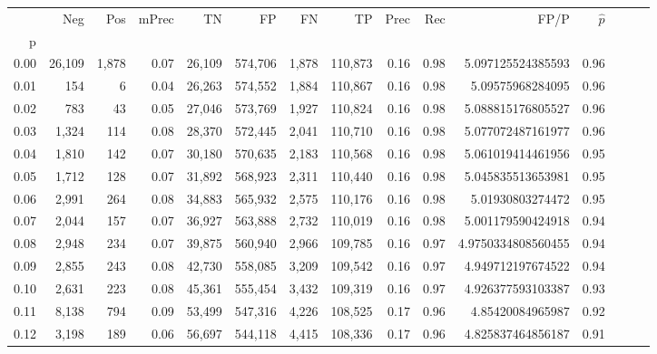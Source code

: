 \begin{tabular}{rrrrrrrrrrrrrrr}
\toprule
{} &     Neg &    Pos & mPrec &       TN &       FP &       FN &       TP &  Prec &   Rec &                  FP/P & $\hat{p}$ \\
p    &         &        &       &          &          &          &          &       &       &                       &           \\
\midrule
0.00 &  26,109 &  1,878 &  0.07 &   26,109 &  574,706 &    1,878 &  110,873 &  0.16 &  0.98 &     5.097125524385593 &      0.96 \\
0.01 &     154 &      6 &  0.04 &   26,263 &  574,552 &    1,884 &  110,867 &  0.16 &  0.98 &      5.09575968284095 &      0.96 \\
0.02 &     783 &     43 &  0.05 &   27,046 &  573,769 &    1,927 &  110,824 &  0.16 &  0.98 &     5.088815176805527 &      0.96 \\
0.03 &   1,324 &    114 &  0.08 &   28,370 &  572,445 &    2,041 &  110,710 &  0.16 &  0.98 &     5.077072487161977 &      0.96 \\
0.04 &   1,810 &    142 &  0.07 &   30,180 &  570,635 &    2,183 &  110,568 &  0.16 &  0.98 &     5.061019414461956 &      0.95 \\
0.05 &   1,712 &    128 &  0.07 &   31,892 &  568,923 &    2,311 &  110,440 &  0.16 &  0.98 &     5.045835513653981 &      0.95 \\
0.06 &   2,991 &    264 &  0.08 &   34,883 &  565,932 &    2,575 &  110,176 &  0.16 &  0.98 &      5.01930803274472 &      0.95 \\
0.07 &   2,044 &    157 &  0.07 &   36,927 &  563,888 &    2,732 &  110,019 &  0.16 &  0.98 &     5.001179590424918 &      0.94 \\
0.08 &   2,948 &    234 &  0.07 &   39,875 &  560,940 &    2,966 &  109,785 &  0.16 &  0.97 &    4.9750334808560455 &      0.94 \\
0.09 &   2,855 &    243 &  0.08 &   42,730 &  558,085 &    3,209 &  109,542 &  0.16 &  0.97 &     4.949712197674522 &      0.94 \\
0.10 &   2,631 &    223 &  0.08 &   45,361 &  555,454 &    3,432 &  109,319 &  0.16 &  0.97 &     4.926377593103387 &      0.93 \\
0.11 &   8,138 &    794 &  0.09 &   53,499 &  547,316 &    4,226 &  108,525 &  0.17 &  0.96 &      4.85420084965987 &      0.92 \\
0.12 &   3,198 &    189 &  0.06 &   56,697 &  544,118 &    4,415 &  108,336 &  0.17 &  0.96 &     4.825837464856187 &      0.91 \\

\end{tabular}
